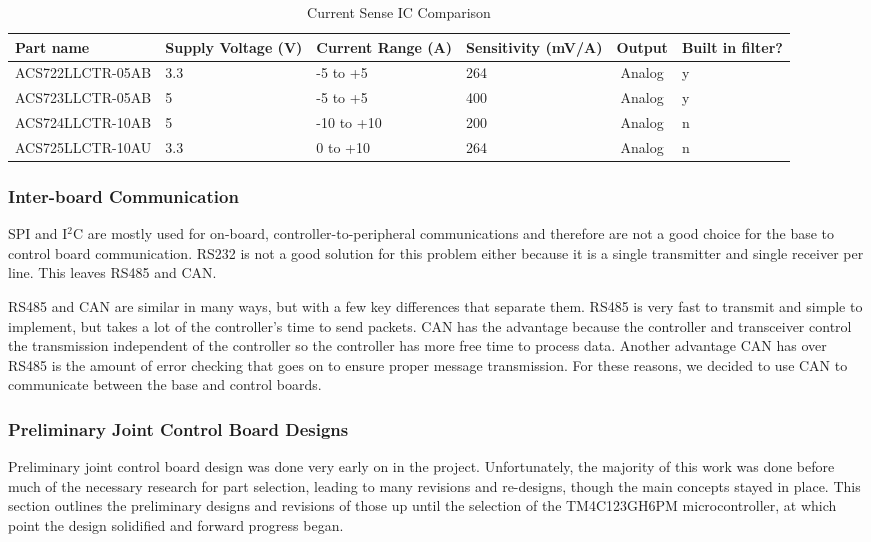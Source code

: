 \begin{table}[H]
	\centering
	\caption{Current Sense IC Comparison}
	\begin{tabular}{|p{4.2cm}|p{1.5cm}|p{2cm}|p{1.7cm}|c|p{1.4cm}|}
\hline
Part name & Supply Voltage (V) & Current Range (A) & Sensitivity (mV/A) & Output & Built in filter? \\
\hline

ACS722LLCTR-05AB & 3.3 & -5 to +5 & 264 & Analog & y \\

ACS723LLCTR-05AB & 5 & -5 to +5 & 400 & Analog & y \\

ACS724LLCTR-10AB & 5 & -10 to +10 & 200 & Analog & n \\

ACS725LLCTR-10AU & 3.3 & 0 to +10 & 264 & Analog & n \\
\hline

\end{tabular}

	\label{tbl:Current Sense IC Comparison}
\end{table}

\subsubsection{Inter-board Communication}
SPI and I$^2$C are mostly used for on-board, controller-to-peripheral communications and therefore are not a good choice for the base to control board communication. RS232 is not a good solution for this problem either because it is a single transmitter and single receiver per line. This leaves RS485 and CAN.

\noindent RS485 and CAN are similar in many ways, but with a few key differences that separate them. RS485 is very fast to transmit and simple to implement, but takes a lot of the controller's time to send packets. CAN has the advantage because the controller and transceiver control the transmission independent of the controller so the controller has more free time to process data. Another advantage CAN has over RS485 is the amount of error checking that goes on to ensure proper message transmission. For these reasons, we decided to use CAN to communicate between the base and control boards.

\subsubsection{Preliminary Joint Control Board Designs}
\label{sec:pjcbd}
Preliminary joint control board design was done very early on in the project. Unfortunately, the majority of this work was done before much of the necessary research for part selection, leading to many revisions and re-designs, though the main concepts stayed in place. This section outlines the preliminary designs and revisions of those up until the selection of the TM4C123GH6PM microcontroller, at which point the design solidified and forward progress began. 

